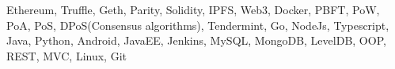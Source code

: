 \vspace{-0.5em}
\vspace{-1.5em}
\begin{cventries}
  \cventry
    {}
    {}
    {}{}
    {
      \begin{cvitems}
        \item {Ethereum, Truffle, Geth, Parity, Solidity, IPFS, Web3, Docker, PBFT, PoW, PoA, PoS, DPoS(Consensus algorithms), Tendermint, Go, NodeJs, Typescript, Java, Python, Android, JavaEE, Jenkins, MySQL, MongoDB, LevelDB, OOP, REST, MVC, Linux, Git}         
      \end{cvitems}
    }
    
\end{cventries}
